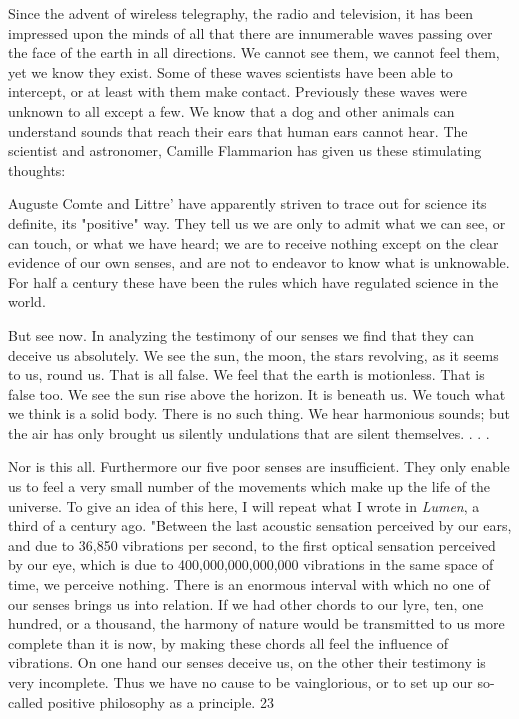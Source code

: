 Since the advent of wireless telegraphy, the radio and television, it has been impressed upon
the minds of all that there are innumerable waves passing over the face of the earth in all
directions. We cannot see them, we cannot feel them, yet we know they exist. Some of these
waves scientists have been able to intercept, or at least with them make contact. Previously
these waves were unknown to all except a few. We know that a dog and other animals can
understand sounds that reach their ears that human ears cannot hear. The scientist and
astronomer, Camille Flammarion has given us these stimulating thoughts:

Auguste Comte and Littre' have apparently striven to trace out for science its definite, its
"positive" way. They tell us we are only to admit what we can see, or can touch, or what we
have heard; we are to receive nothing except on the clear evidence of our own senses, and are
not to endeavor to know what is unknowable. For half a century these have been the rules
which have regulated science in the world.

But see now. In analyzing the testimony of our senses we find that they can deceive us
absolutely. We see the sun, the moon, the stars revolving, as it seems to us, round us. That is
all false. We feel that the earth is motionless. That is false too. We see the sun rise above the
horizon. It is beneath us. We touch what we think is a solid body. There is no such thing. We
hear harmonious sounds; but the air has only brought us silently undulations that are silent
themselves. . . .

Nor is this all. Furthermore our five poor senses are insufficient. They only enable us to feel
a very small number of the movements which make up the life of the universe. To give an
idea of this here, I will repeat what I wrote in \textit{Lumen}, a third of a century ago. "Between the
last acoustic sensation perceived by our ears, and due to 36,850 vibrations per second, to the
first optical sensation perceived by our eye, which is due to 400,000,000,000,000 vibrations
in the same space of time, we perceive nothing. There is an enormous interval with which no
one of our senses brings us into relation. If we had other chords to our lyre, ten, one hundred,
or a thousand, the harmony of nature would be transmitted to us more complete than it is
now, by making these chords all feel the influence of vibrations. On one hand our senses
deceive us, on the other their testimony is very incomplete. Thus we have no cause to be
vainglorious, or to set up our so-called positive philosophy as a principle. 23


